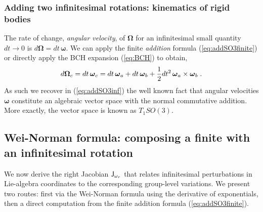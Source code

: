 \documentclass[conference]{IEEEtran}
\newcommand{\bfomega}{\boldsymbol{\omega}}
\newcommand{\bfOmega}{\boldsymbol{\Omega}}
\newcommand{\beq}{\begin{equation}}
\newcommand{\eeq}{\end{equation}}
\begin{document}
\begin{appendix}
\subsubsection{Adding two infinitesimal rotations: kinematics of rigid bodies}
The rate of change, {\em angular velocity}, of $\bfOmega$ for an infinitesimal small quantity $dt\rightarrow 0$
is $d\bfOmega = dt\, \bfomega$. We can apply the finite {\em addition} formula (\ref{eq:addSO3finite}) or
directly apply the BCH expansion (\ref{eq:BCH}) to obtain,
\beq
    d\bfOmega_c = dt\, \bfomega_c = dt\, \bfomega_a + dt\, \bfomega_b + {1\over 2} dt^2\, \bfomega_a\times\bfomega_b\;.
    \label{eq:addSO3inf}
\eeq
As such we recover in (\ref{eq:addSO3inf}) the well known fact that angular velocities $\bfomega$
constitute an algebraic vector space with the normal commutative addition. More exactly, the
vector space is known as $T_1SO(3)$.

\subsection{Wei-Norman formula: composing a finite with an infinitesimal rotation}
\label{app:weinorman}
We now derive the right Jacobian ${\sf J}_{\omega_r}$ that relates infinitesimal
perturbations in Lie-algebra coordinates to the corresponding group-level variations.
We present two routes: first via the Wei-Norman formula using the derivative of
exponentials, then a direct computation from the finite addition formula
(\ref{eq:addSO3finite}).


\end{appendix}
\end{document}
